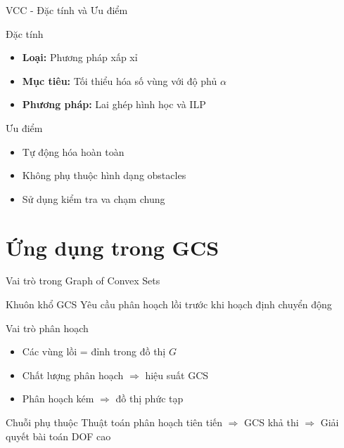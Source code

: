 \documentclass[aspectratio=169]{beamer}
\begin{document}
\begin{frame}{VCC - Đặc tính và Ưu điểm}

    \begin{block}{Đặc tính}
        \begin{itemize}
            \item \textbf{Loại:} Phương pháp xấp xỉ
            \item \textbf{Mục tiêu:} Tối thiểu hóa số vùng với độ phủ $\alpha$
            \item \textbf{Phương pháp:} Lai ghép hình học và ILP
        \end{itemize}
    \end{block}

    \begin{exampleblock}{Ưu điểm}
        \begin{itemize}
            \item Tự động hóa hoàn toàn
            \item Không phụ thuộc hình dạng obstacles
            \item Sử dụng kiểm tra va chạm chung
        \end{itemize}
    \end{exampleblock}


\end{frame}

\section{Ứng dụng trong GCS}

\begin{frame}{Vai trò trong Graph of Convex Sets}

    \begin{block}{Khuôn khổ GCS}
        Yêu cầu phân hoạch lồi trước khi hoạch định chuyển động
    \end{block}

    \begin{block}{Vai trò phân hoạch}
        \begin{itemize}
            \item Các vùng lồi = đỉnh trong đồ thị $G$
            \item Chất lượng phân hoạch $\Rightarrow$ hiệu suất GCS
            \item Phân hoạch kém $\Rightarrow$ đồ thị phức tạp
        \end{itemize}
    \end{block}

    \begin{alertblock}{Chuỗi phụ thuộc}
        Thuật toán phân hoạch tiên tiến $\Rightarrow$ GCS khả thi $\Rightarrow$ Giải quyết bài toán DOF cao
    \end{alertblock}

\end{frame}
\end{document}
